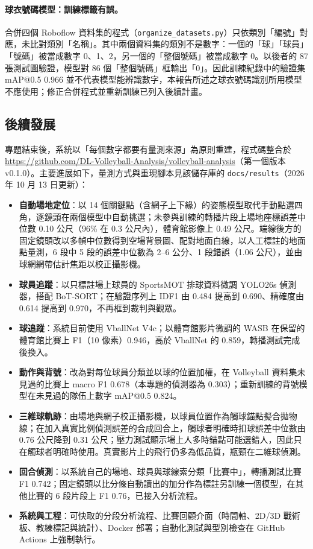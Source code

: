 \documentclass[a4paper,14pt,oneside]{article}
\begin{document}
\paragraph{球衣號碼模型：訓練標籤有誤。}合併四個 Roboflow 資料集的程式（\texttt{organize\_datasets.py}）只依類別「編號」對應，未比對類別「名稱」。其中兩個資料集的類別不是數字：一個的「球」「球員」「號碼」被當成數字 0、1、2，另一個的「整個號碼」被當成數字 0。以後者的 87 張測試圖驗證，模型對 86 個「整個號碼」框輸出「0」。因此訓練紀錄中的驗證集 mAP@0.5 0.966 並不代表模型能辨識數字，本報告所述之球衣號碼識別所用模型不應使用；修正合併程式並重新訓練已列入後續計畫。

\subsection{後續發展}

專題結束後，系統以「每個數字都要有量測來源」為原則重建，程式碼整合於 \url{https://github.com/DL-Volleyball-Analysis/volleyball-analysis}（第一個版本 v0.1.0）。主要進展如下，量測方式與重現腳本見該儲存庫的 \texttt{docs/results}（2026 年 10 月 13 日更新）：

\begin{itemize}
    \item \textbf{自動場地定位}：以 14 個關鍵點（含網子上下緣）的姿態模型取代手動點選四角，逐鏡頭在兩個模型中自動挑選；未參與訓練的轉播片段上場地座標誤差中位數 0.10 公尺（96\% 在 0.3 公尺內），體育館影像上 0.49 公尺。端線後方的固定鏡頭改以多幀中位數得到空場背景圖、配對地面白線，以人工標註的地面點量測，6 段中 5 段的誤差中位數為 2–6 公分、1 段錯誤（1.06 公尺），並由球網網帶估計焦距以校正攝影機。
    \item \textbf{球員追蹤}：以只標註場上球員的 SportsMOT 排球資料微調 YOLO26s 偵測器，搭配 BoT-SORT；在驗證序列上 IDF1 由 0.484 提高到 0.690、精確度由 0.614 提高到 0.970，不再框到裁判與觀眾。
    \item \textbf{球追蹤}：系統目前使用 VballNet V4c；以體育館影片微調的 WASB 在保留的體育館比賽上 F1（10 像素）0.946，高於 VballNet 的 0.859，轉播測試完成後換入。
    \item \textbf{動作與背號}：改為對每位球員分類並以球的位置加權，在 Volleyball 資料集未見過的比賽上 macro F1 0.678（本專題的偵測器為 0.303）；重新訓練的背號模型在未見過的隊伍上數字 mAP@0.5 0.824。
    \item \textbf{三維球軌跡}：由場地與網子校正攝影機，以球員位置作為觸球錨點擬合拋物線；在加入真實比例偵測誤差的合成回合上，觸球者明確時扣球誤差中位數由 0.76 公尺降到 0.31 公尺；壓力測試顯示場上人多時錨點可能選錯人，因此只在觸球者明確時使用。真實影片上的飛行仍多為低品質，瓶頸在二維球偵測。
    \item \textbf{回合偵測}：以系統自己的場地、球員與球線索分類「比賽中」，轉播測試比賽 F1 0.742；固定鏡頭以比分條自動讀出的加分作為標註另訓練一個模型，在其他比賽的 6 段片段上 F1 0.76，已接入分析流程。
    \item \textbf{系統與工程}：可快取的分段分析流程、比賽回顧介面（時間軸、2D/3D 戰術板、教練標記與統計）、Docker 部署；自動化測試與型別檢查在 GitHub Actions 上強制執行。
\end{itemize}
\end{document}
